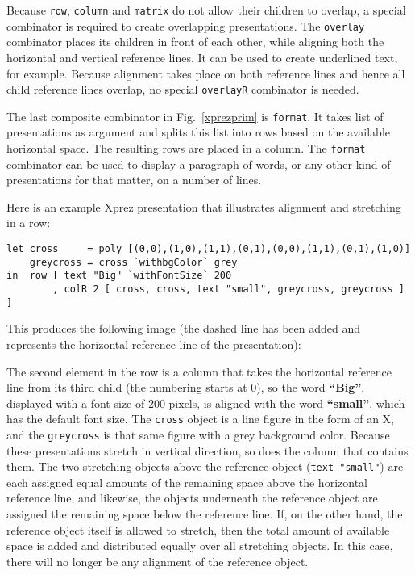 Because \texttt{row}, \texttt{column} and \texttt{matrix} do not allow their children to overlap, a special combinator is required to create overlapping presentations. The \texttt{overlay} combinator places its children in front of each other, while aligning both the horizontal and vertical reference lines. It can be used to create underlined text, for example. Because alignment takes place on both reference lines and hence all child reference lines overlap, no special \texttt{overlayR} combinator is needed. 

The last composite combinator in Fig.~\ref{xprezprim} is \texttt{format}. It takes list of presentations as argument and splits this list into rows based on the available horizontal space. The resulting rows are placed in a column. The \texttt{format} combinator can be used to display a paragraph of words, or any other kind of presentations for that matter, on a number of lines. 

Here is an example {\sc Xprez} presentation that illustrates alignment and stretching in a row:

\begin{small}
\begin{verbatim}
let cross     = poly [(0,0),(1,0),(1,1),(0,1),(0,0),(1,1),(0,1),(1,0)]
    greycross = cross `withbgColor` grey
in  row [ text "Big" `withFontSize` 200
        , colR 2 [ cross, cross, text "small", greycross, greycross ] ] 
\end{verbatim}
\end{small}

\noindent This produces the following image (the dashed line has been added and represents the horizontal reference line of the presentation):

\begin{center}
\end{center}

The second element in the row is a column that takes the horizontal reference line from its third child (the numbering starts at 0), so the word {\bf ``Big''}, displayed with a font size of 200 pixels, is aligned with the word {\bf ``small''}, which has the default font size. The \texttt{cross} object is a line figure in the form of an X, and the \texttt{greycross} is that same figure with a grey background color. Because these presentations stretch in vertical direction, so does the column that contains them. The two stretching objects above the reference object (\texttt{text "small"}) are each assigned equal amounts of the remaining space above the horizontal reference line, and likewise, the objects underneath the reference object are assigned the remaining space below the reference line. If, on the other hand, the reference object itself is allowed to stretch, then the total amount of available space is added and distributed equally over all stretching objects. In this case, there will no longer be any alignment of the reference object. 


